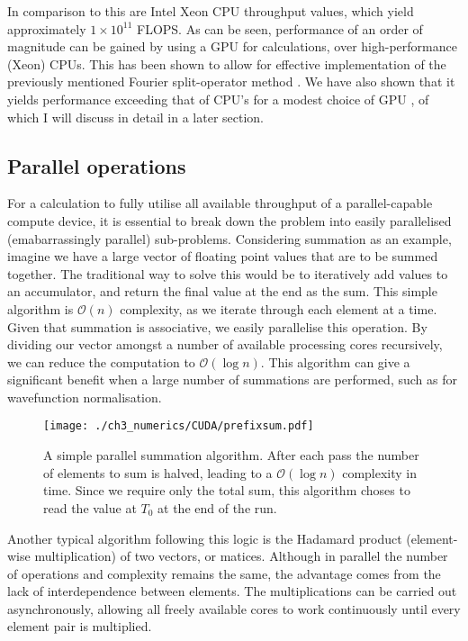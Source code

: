 In comparison to this are Intel Xeon CPU throughput values, which yield approximately $1\times10^{11}$ FLOPS. As can be seen, performance of an order of magnitude can be gained by using a GPU for calculations, over high-performance (Xeon) CPUs. This has been shown to allow for effective implementation of the previously mentioned Fourier split-operator method \cite{Num:Bauke_cpc_2011}. We have also shown that it yields performance exceeding that of CPU's for a modest choice of GPU \cite{AO:Morgan_ORiordan_pra_2013}, of which I will discuss in detail in a later section.

\subsection{Parallel operations}\label{subsec:par_op}
\label{sub:Parallel operations}
For a calculation to fully utilise all available throughput of a parallel-capable
compute device, it is essential to break down the problem into easily parallelised (emabarrassingly parallel) sub-problems. Considering summation as an example, imagine we have a large vector of floating point values that are to be summed together. The traditional way to solve this would be to iteratively add values to an accumulator, and return the final value at the end as the sum. This simple algorithm is $\mathcal{O}(n)$ complexity, as we iterate through each element at a time. Given that summation is associative, we easily parallelise this operation. By dividing our vector amongst a number of available processing cores recursively, we can reduce the computation to $\mathcal{O}(\log{} n)$. This algorithm can give a significant benefit when a large number of summations are performed, such as for wavefunction normalisation.

\begin{figure}
    \centering
    \texttt{[image: ./ch3\_numerics/CUDA/prefixsum.pdf]}
    \caption{A simple parallel summation algorithm. After each pass the number of elements to sum is halved, leading to a $\mathcal{O}(\log{} n)$ complexity in time. Since we require only the total sum, this algorithm choses to read the value at $T_0$ at the end of the run.}
    \label{fig:prefixsum}
\end{figure}

Another typical algorithm following this logic is the Hadamard product (element-wise multiplication) of two vectors, or matices. Although in parallel the number of operations and complexity remains the same, the advantage comes from the lack of interdependence between elements. The multiplications can be carried out asynchronously, allowing all freely available cores to work continuously until every element pair is multiplied.


